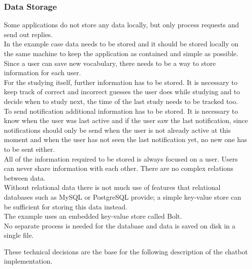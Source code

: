 \subsubsection{Data Storage}

Some applications do not store any data locally, but only process requests and send out replies.
\\
In the example case data needs to be stored and it should be stored locally on the same machine
to keep the application as contained and simple as possible.
\\

Since a user can save new vocabulary,
there needs to be a way to store information for each user.
\\
For the studying itself, further information has to be stored.
It is necessary to keep track of correct and incorrect guesses the user does while studying
and to decide when to study next, the time of the last study needs to be tracked too.
\\

To send notification additional information has to be stored.
It is necessary to know when the user was last active and if the user saw the last notification,
since notifications should only be send when the user is not already active at this moment
and when the user has not seen the last notification yet, no new one has to be sent either.
\\

All of the information required to be stored is always focused on a user.
Users can never share information with each other.
There are no complex relations between data.
\\
Without relational data there is not much use of features that relational databases such as MySQL or PostgreSQL provide;
a simple key-value store can be sufficient for storing this data instead.
\\
The example uses an embedded key-value store called Bolt\cite{boltdb}.
\\
No separate process is needed for the database and data is saved on disk in a single file.



These technical decisions are the base for the following description of the chatbot implementation.

